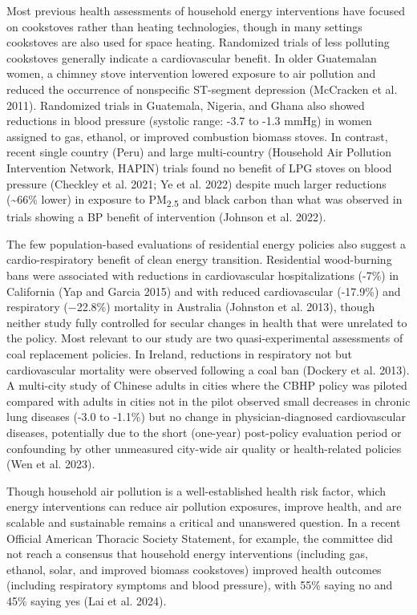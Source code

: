 \documentclass[
  letterpaper,
  DIV=11,
  numbers=noendperiod]{scrartcl}
\begin{document}
Most previous health assessments of household energy interventions have
focused on cookstoves rather than heating technologies, though in many
settings cookstoves are also used for space heating. Randomized trials
of less polluting cookstoves generally indicate a cardiovascular
benefit. In older Guatemalan women, a chimney stove intervention lowered
exposure to air pollution and reduced the occurrence of nonspecific
ST-segment depression (McCracken et al. 2011). Randomized trials in
Guatemala, Nigeria, and Ghana also showed reductions in blood pressure
(systolic range: -3.7 to -1.3 mmHg) in women assigned to gas, ethanol,
or improved combustion biomass stoves. In contrast, recent single
country (Peru) and large multi-country (Household Air Pollution
Intervention Network, HAPIN) trials found no benefit of LPG stoves on
blood pressure (Checkley et al. 2021; Ye et al. 2022) despite much
larger reductions (\textasciitilde66\% lower) in exposure to
PM\textsubscript{2.5} and black carbon than what was observed in trials
showing a BP benefit of intervention (Johnson et al. 2022).

The few population-based evaluations of residential energy policies also
suggest a cardio-respiratory benefit of clean energy transition.
Residential wood-burning bans were associated with reductions in
cardiovascular hospitalizations (-7\%) in California (Yap and Garcia
2015) and with reduced cardiovascular (-17.9\%) and respiratory
(−22.8\%) mortality in Australia (Johnston et al. 2013), though neither
study fully controlled for secular changes in health that were unrelated
to the policy. Most relevant to our study are two quasi-experimental
assessments of coal replacement policies. In Ireland, reductions in
respiratory not but cardiovascular mortality were observed following a
coal ban (Dockery et al. 2013). A multi-city study of Chinese adults in
cities where the CBHP policy was piloted compared with adults in cities
not in the pilot observed small decreases in chronic lung diseases (-3.0
to -1.1\%) but no change in physician-diagnosed cardiovascular diseases,
potentially due to the short (one-year) post-policy evaluation period or
confounding by other unmeasured city-wide air quality or health-related
policies (Wen et al. 2023).

Though household air pollution is a well-established health risk factor,
which energy interventions can reduce air pollution exposures, improve
health, and are scalable and sustainable remains a critical and
unanswered question. In a recent Official American Thoracic Society
Statement, for example, the committee did not reach a consensus that
household energy interventions (including gas, ethanol, solar, and
improved biomass cookstoves) improved health outcomes (including
respiratory symptoms and blood pressure), with 55\% saying no and 45\%
saying yes (Lai et al. 2024).
\end{document}

